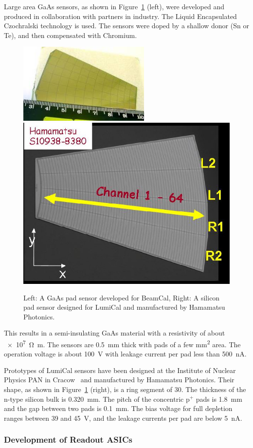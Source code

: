 Large area GaAs sensors, as shown in Figure~\ref{fig:GaAs} (left), were developed
and produced in collaboration with partners in industry. The Liquid Encapsulated
Czochralski technology is used. The sensors were
doped by a shallow donor (Sn or Te),
and then compensated  with Chromium.
\begin{figure}
\centering
    \includegraphics[width=0.4\columnwidth, height=4cm]{Calorimeter/FCAL/figs/GaAs_sensor_new.jpg}
    \hspace{1cm}
     \includegraphics[width=0.4\columnwidth]{Calorimeter/FCAL/figs/si_proto.jpg}
          \caption{Left: A GaAs pad sensor developed for BeamCal, Right: A silicon pad sensor designed for LumiCal and manufactured by Hamamatsu Photonics.}
    \label{fig:GaAs}
\end{figure}
This results in a semi-insulating GaAs material with a resistivity of about \SI{e7}{\ohm \meter}.
The sensors are \SI{0.5}{mm} thick with pads of a few \si{\milli\meter\squared} area. The operation voltage is about \SI{100}{V} with
leakage current per pad less than \SI{500}{nA}.

Prototypes of LumiCal sensors have been designed
at the Institute of Nuclear Physics PAN
in Cracow~\cite{EUDETMEMO-2009-07} 
and manufactured by Hamamatsu
Photonics.
Their shape, as shown in Figure~\ref{fig:GaAs} (right), is a ring segment of 30\textdegree.
The thickness of the n-type silicon bulk is \SI{0.320}{mm}.
The pitch of the concentric p$^+$ pads is \SI{1.8}{mm} and
the gap between two pads is \SI{0.1}{mm}.
The bias voltage for full depletion ranges between 39 and \SI{45}{V},
and the leakage currents per pad are below \SI{5}{nA}.

\subsubsection{Development of Readout ASICs}

